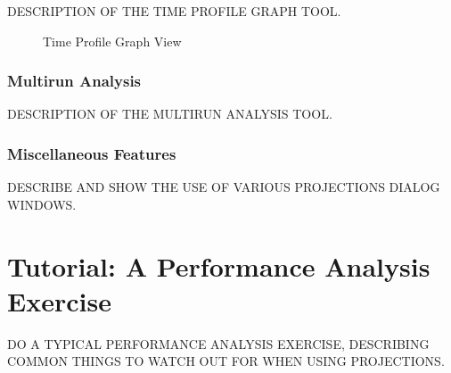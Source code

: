 \documentclass[10pt,dvips]{article}
\begin{document}
DESCRIPTION OF THE TIME PROFILE GRAPH TOOL.

\begin{figure}[htb]
\center
{}
\caption{Time Profile Graph View}
\label{time profile}
\end{figure}

\subsubsection{Multirun Analysis}

DESCRIPTION OF THE MULTIRUN ANALYSIS TOOL.

\subsubsection{Miscellaneous Features}

DESCRIBE AND SHOW THE USE OF VARIOUS PROJECTIONS DIALOG WINDOWS.

\section{Tutorial: A Performance Analysis Exercise}

DO A TYPICAL PERFORMANCE ANALYSIS EXERCISE, DESCRIBING COMMON THINGS TO
WATCH OUT FOR WHEN USING PROJECTIONS.
\end{document}
